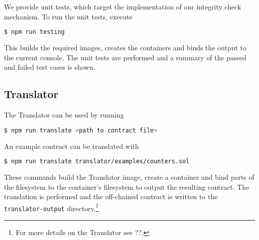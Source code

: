 We provide unit tests, which target the implementation of our integrity check mechanism. To run the unit tests, execute
\begin{lstlisting}[language=bash]
$ npm run testing
\end{lstlisting}
This builds the required images, creates the containers and binds the output to the current console. The unit tests are performed and a summary of the passed and failed test cases is shown.

\subsection*{Translator}

The Translator can be used by running
\begin{lstlisting}[language=bash]
$ npm run translate <path to contract file>
\end{lstlisting}
An example contract can be translated with
\begin{lstlisting}[language=bash]
$ npm run translate translator/examples/counters.sol
\end{lstlisting}
These commands build the Translator image, create a container and bind parts of the filesystem to the container's filesystem to output the resulting contract. The translation is performed and the off-chained contract is written to the \texttt{translator-output} directory.\footnote{For more details on the Translator see ??.}
